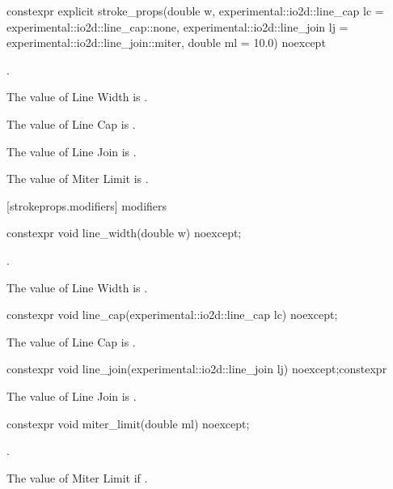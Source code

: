 \begin{itemdecl}
constexpr explicit stroke_props(double w,
  experimental::io2d::line_cap lc = experimental::io2d::line_cap::none,
  experimental::io2d::line_join lj = experimental::io2d::line_join::miter,
  double ml = 10.0) noexcept    
\end{itemdecl}
\begin{itemdescr}
\pnum
\preconditions
{}.

\pnum
{}

\pnum
\effects
The value of Line Width is .

\pnum
The value of Line Cap is .

\pnum
The value of Line Join is .

\pnum
The value of Miter Limit is .
\end{itemdescr}

 [strokeprops.modifiers] { modifiers}

\begin{itemdecl}
constexpr void line_width(double w) noexcept;
\end{itemdecl}
\begin{itemdescr}
\pnum
\preconditions
{}.

\pnum
\effects
The value of Line Width is .
\end{itemdescr}

\begin{itemdecl}
constexpr void line_cap(experimental::io2d::line_cap lc) noexcept;
\end{itemdecl}
\begin{itemdescr}
\pnum
\effects
The value of Line Cap is .
\end{itemdescr}

\begin{itemdecl}
constexpr void line_join(experimental::io2d::line_join lj) noexcept;constexpr \end{itemdecl}
\begin{itemdescr}
\pnum
\effects
The value of Line Join is .
\end{itemdescr}

\begin{itemdecl}
constexpr void miter_limit(double ml) noexcept;
\end{itemdecl}
\begin{itemdescr}
\pnum
\preconditions
{}.

\pnum
The value of Miter Limit if .
\end{itemdescr}

